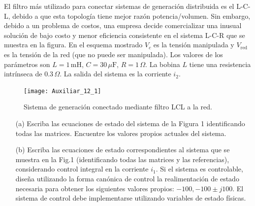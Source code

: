 \documentclass[
  11pt,
  letterpaper,
   addpoints,
   answers
  ]{exam}
\begin{document}
\newpage
\begin{questions}
    \question 
    El filtro más utilizado para conectar sistemas de generación distribuida es el L-C-L, debido a que esta topología tiene mejor razón potencia/volumen. Sin embargo, debido a un problema de costos, una empresa decide comercializar una inusual solución de bajo costo y menor eficiencia consistente en el sistema L-C-R que se muestra en la figura. En el esquema mostrado \( V_c \) es la tensión manipulada y \( V_{\text{red}} \) es la tensión de la red (que no puede ser manipulada). Los valores de los parámetros son \( L = 1\,\text{mH} \), \( C = 30\,\mu\text{F} \), \( R = 1\,\Omega \). La bobina \( L \) tiene una resistencia intrínseca de \( 0.3\,\Omega \). La salida del sistema es la corriente \( i_2 \).

    \begin{figure}[h!]
        \centering
        \texttt{[image: Auxiliar\_12\_1]}
        \caption{Sistema de generación conectado mediante filtro LCL a la red.}
    \end{figure}

    \begin{enumerate}
        \item[(a)] Escriba las ecuaciones de estado del sistema de la Figura 1 identificando todas las matrices. Encuentre los valores propios actuales del sistema.
        
        \item[(b)] Escriba las ecuaciones de estado correspondientes al sistema que se muestra en la Fig.1 (identificando todas las matrices y las referencias), considerando control integral en la corriente \( i_1 \). Si el sistema es controlable, diseña utilizando la forma canónica de control la realimentación de estado necesaria para obtener los siguientes valores propios: \(-100, -100 \pm j100\). El sistema de control debe implementarse utilizando variables de estado físicas.
    \end{enumerate}
\begin{solution}

\end{solution}
\end{questions}
\end{document}
